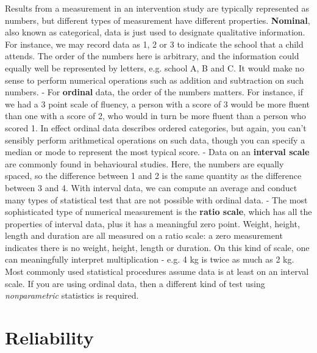 \documentclass{krantz}
\begin{document}
\begin{tcolorbox}[colback=Black!5!lightgray,colframe=black!75!black,coltitle=white,title=Types of numerical measurement]\label{box:numerical}
Results from a measurement in an intervention study are typically represented as numbers, but different types of measurement have different properties. \textbf{Nominal}, also known as categorical, data is just used to designate qualitative information. For instance, we may record data as 1, 2 or 3 to indicate the school that a child attends. The order of the numbers here is arbitrary, and the information could equally well be represented by letters, e.g. school A, B and C. It would make no sense to perform numerical operations such as addition and subtraction on such numbers.  
- For \textbf{ordinal} data, the order of the numbers matters. For instance, if we had a 3 point scale of fluency, a person with a score of 3 would be more fluent than one with a score of 2, who would in turn be more fluent than a person who scored 1. In effect ordinal data describes ordered categories, but again, you can't sensibly perform arithmetical operations on such data, though you can specify a median or mode to represent the most typical score. 
- Data on an \textbf{interval scale}  are commonly found in behavioural studies. Here, the numbers are equally spaced, so the difference between 1 and 2 is the same quantity as the difference between 3 and 4. With interval data, we can compute an average and conduct many types of statistical test that are not possible with ordinal data.  
- The most sophisticated type of numerical measurement is the \textbf{ratio scale}, which has all the properties of interval data, plus it has a meaningful zero point. Weight, height, length and duration are all measured on a ratio scale: a zero measurement indicates there is no weight, height, length or duration. On this kind of scale, one can meaningfully interpret multiplication - e.g. 4 kg is twice as much as 2 kg. 
Most commonly used statistical procedures assume data is at least on an interval scale. If you are using ordinal data, then a different kind of test using \textit{nonparametric} statistics is required.
\end{tcolorbox}
\hypertarget{reliability-1}{%
\section{Reliability}\label{reliability-1}}
\end{document}

